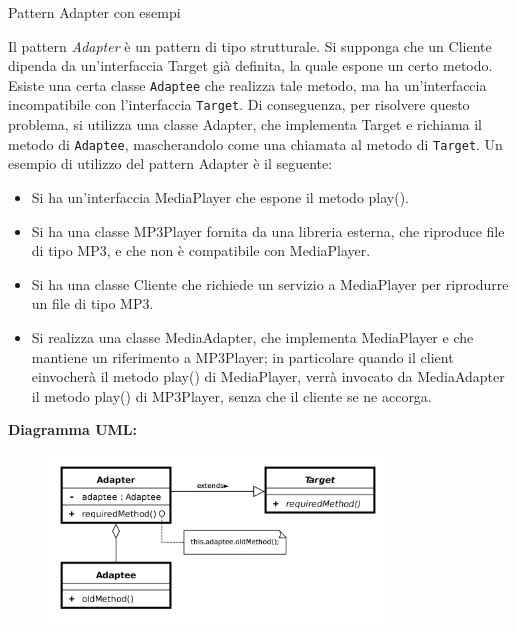 \begin{problem}{1.20}
Pattern Adapter con esempi
\end{problem}
\begin{solution}
Il pattern \textit{Adapter} è un pattern di tipo strutturale.
Si supponga che un Cliente dipenda da un'interfaccia Target già definita, la quale espone un certo metodo.
Esiste una certa classe \texttt{Adaptee} che realizza tale metodo, ma ha un'interfaccia incompatibile con l'interfaccia \texttt{Target}.
Di conseguenza, per risolvere questo problema, si utilizza una classe Adapter, che implementa Target e richiama il metodo di \texttt{Adaptee}, mascherandolo come una chiamata al metodo di \texttt{Target}.
Un esempio di utilizzo del pattern Adapter è il seguente:
\begin{itemize}
	\item Si ha un'interfaccia MediaPlayer che espone il metodo play().
	\item Si ha una classe MP3Player fornita da una libreria esterna, che riproduce file di tipo MP3, e che non è compatibile con MediaPlayer.
	\item Si ha una classe Cliente che richiede un servizio a MediaPlayer per riprodurre un file di tipo MP3.
	\item Si realizza una classe MediaAdapter, che implementa MediaPlayer e che mantiene un riferimento a MP3Player; in particolare quando il client einvocherà il metodo play() di MediaPlayer, verrà invocato da MediaAdapter il metodo play() di MP3Player, senza che il cliente se ne accorga.
\end{itemize}
\textbf{Diagramma UML:}
\begin{figure}[htb!]
	\centering
	\label{ObserverPattern}
	\includegraphics[width=9cm]{./immagini/adapterPattern.png}
\end{figure}
\end{solution}


